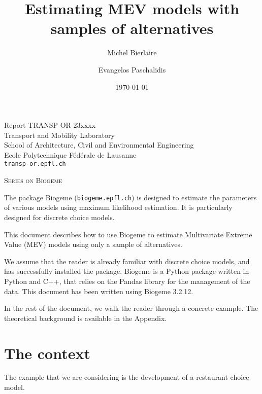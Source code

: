 \documentclass[12pt,a4paper]{article}
\title{Estimating MEV models with samples of alternatives}
\author{Michel Bierlaire \and Evangelos Paschalidis}
\date{\today}
\begin{document}
\begin{titlepage}
  \pagestyle{empty}

  \maketitle
  \vspace{2cm}

  \begin{center}
    \small Report TRANSP-OR 23xxxx \\ Transport and Mobility Laboratory \\ School of Architecture, Civil and Environmental Engineering \\ Ecole Polytechnique F\'ed\'erale de Lausanne \\ \verb+transp-or.epfl.ch+
    \begin{center}
      \textsc{Series on Biogeme}
    \end{center}
  \end{center}


  \clearpage
\end{titlepage}


The package Biogeme (\texttt{biogeme.epfl.ch}) is designed to estimate
the parameters of various models using maximum likelihood
estimation. It is particularly designed for discrete choice
models.

This document describes how to use Biogeme to estimate
Multivariate Extreme Value (MEV) models using only a sample of
alternatives. 

We assume that the reader is already familiar with discrete choice
models, and has successfully installed the package.  Biogeme is
a Python package written in Python and C++, that relies on the
Pandas library for the management of the data.  This document has
been written using Biogeme 3.2.12.

In the rest of the document, we walk the reader through a concrete
example. The theoretical background is available in the Appendix.

\section{The context}
\label{eq:context}

The example that we are considering is the development of a restaurant choice model.
\end{document}
